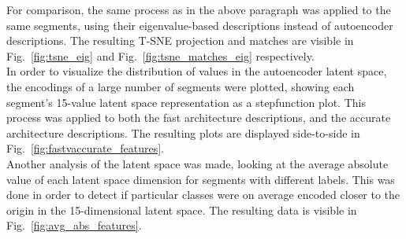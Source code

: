 For comparison, the same process as in the above paragraph was applied to the same segments, using their eigenvalue-based descriptions instead of autoencoder descriptions. The resulting T-SNE projection and matches are visible in Fig.~\ref{fig:tsne_eig} and Fig.~\ref{fig:tsne_matches_eig} respectively.\\

In order to visualize the distribution of values in the autoencoder latent space, the encodings of a large number of segments were plotted, showing each segment's 15-value latent space representation as a stepfunction plot. This process was applied to both the fast architecture descriptions, and the accurate architecture descriptions. The resulting plots are displayed side-to-side in Fig.~\ref{fig:fastvaccurate_features}.\\

Another analysis of the latent space was made, looking at the average absolute value of each latent space dimension for segments with different labels. This was done in order to detect if particular classes were on average encoded closer to the origin in the 15-dimensional latent space. The resulting data is visible in Fig.~\ref{fig:avg_abs_features}.\\


